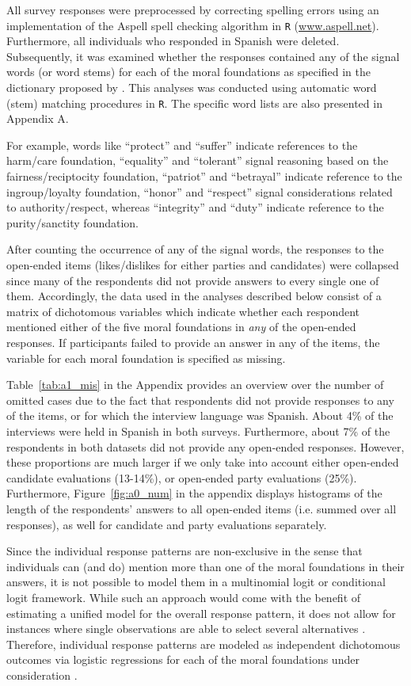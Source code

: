 \documentclass[12pt]{article}
\begin{document}
All survey responses were preprocessed by correcting spelling errors using an implementation of the Aspell spell checking algorithm in \texttt{R} (\url{www.aspell.net}). Furthermore, all individuals who responded in Spanish were deleted. Subsequently, it was examined whether the responses contained any of the signal words (or word stems) for each of the moral foundations as specified in the dictionary proposed by \citet{graham2009liberals}. This analyses was conducted using automatic word (stem) matching procedures in \texttt{R}. The specific word lists are also presented in Appendix A. 

For example, words like ``protect'' and ``suffer'' indicate references to the harm/care foundation, ``equality'' and ``tolerant'' signal reasoning based on the fairness/reciptocity foundation, ``patriot'' and ``betrayal'' indicate reference to the ingroup/loyalty foundation, ``honor'' and ``respect'' signal considerations related to authority/respect, whereas ``integrity'' and ``duty'' indicate reference to the purity/sanctity foundation.

After counting the occurrence of any of the signal words, the responses to the open-ended items (likes/dislikes for either parties and candidates) were collapsed since many of the respondents did not provide answers to every single one of them. Accordingly, the data used in the analyses described below consist of a matrix of dichotomous variables which indicate whether each respondent mentioned either of the five moral foundations in \textit{any} of the open-ended responses. If participants failed to provide an answer in any of the items, the variable for each moral foundation is specified as missing.

Table~\ref{tab:a1_mis} in the Appendix provides an overview over the number of omitted cases due to the fact that respondents did not provide responses to any of the items, or for which the interview language was Spanish. About 4\% of the interviews were held in Spanish in both surveys. Furthermore, about 7\% of the respondents in both datasets did not provide any open-ended responses. However, these proportions are much larger if we only take into account either open-ended candidate evaluations (13-14\%), or open-ended party evaluations (25\%). Furthermore, Figure~\ref{fig:a0_num} in the appendix displays histograms of the length of the respondents' answers to all open-ended items (i.e. summed over all responses), as well for candidate and party evaluations separately.

Since the individual response patterns are non-exclusive in the sense that individuals can (and do) mention more than one of the moral foundations in their answers, it is not possible to model them in a multinomial logit or conditional logit framework. While such an approach would come with the benefit of estimating a unified model for the overall response pattern, it does not allow for instances where single observations are able to select several alternatives \citep[but see][]{gilbert2007models}. Therefore, individual response patterns are modeled as independent dichotomous outcomes via logistic regressions for each of the moral foundations under consideration \citep[c.f. for example][]{agresti1999modeling}.
\end{document}
